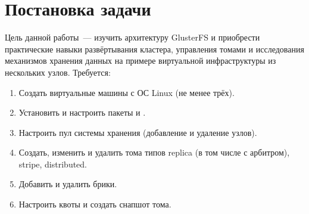 \newpage
\section{Постановка задачи}

Цель данной работы~--- изучить архитектуру GlusterFS и приобрести практические навыки развёртывания кластера, управления томами и исследования механизмов хранения данных на примере виртуальной инфраструктуры из нескольких узлов. Требуется:
\begin{enumerate}
  \item Создать виртуальные машины с ОС Linux (не менее трёх).
  \item Установить и настроить пакеты  и .
  \item Настроить пул системы хранения (добавление и удаление узлов).
  \item Создать, изменить и удалить тома типов replica (в том числе с арбитром), stripe, distributed.
  \item Добавить и удалить брики.
  \item Настроить квоты и создать снапшот тома.
\end{enumerate}
